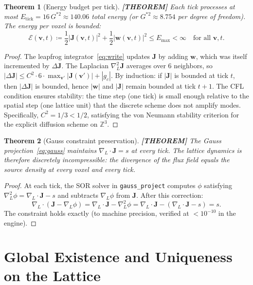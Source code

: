 \documentclass[11pt]{article}
\theoremstyle{tight}
\newtheorem{theorem}{Theorem}[section]
\theoremstyle{plainroman}
\newcommand{\Z}{\mathbb{Z}}
\begin{document}
\begin{theorem}[Energy budget per tick]\label{thm:energy}
\textbf{[THEOREM]}
Each tick processes at most $E_{\mathrm{tick}}=16\,G^{*2}\approx 140.06$ total energy (or $G^{*2}\approx 8.754$ per degree of freedom).
The energy per voxel is bounded:
\[
\mathcal E(\mathbf v,t)\coloneqq\frac{1}{2}|\mathbf J(\mathbf v,t)|^2+\frac{1}{2}|\mathbf w(\mathbf v,t)|^2\le E_{\max}<\infty \quad \text{for all } \mathbf v,t.
\]
\end{theorem}
\begin{proof}
The leapfrog integrator~\eqref{eq:write} updates $\mathbf J$ by adding $\mathbf w$, which was itself incremented by $\Delta\mathbf J$.
The Laplacian $\nabla_L^2\mathbf J$ averages over 6 neighbors, so $|\Delta\mathbf J|\le C^2\cdot 6\cdot\max_{\mathbf v'}|\mathbf J(\mathbf v')|+|g_c|$.
By induction: if $|\mathbf J|$ is bounded at tick $t$, then $|\Delta\mathbf J|$ is bounded, hence $|\mathbf w|$ and $|\mathbf J|$ remain bounded at tick $t+1$.
The CFL condition ensures stability: the time step (one tick) is small enough relative to the spatial step (one lattice unit) that the discrete scheme does not amplify modes.
Specifically, $C^2=1/3<1/2$, satisfying the von Neumann stability criterion for the explicit diffusion scheme on $\Z^3$.
\end{proof}

\begin{theorem}[Gauss constraint preservation]\label{thm:gauss_preserve}
\textbf{[THEOREM]}
The Gauss projection~\eqref{eq:gauss} maintains $\nabla_L\!\cdot\!\mathbf J=s$ at every tick.
The lattice dynamics is therefore \emph{discretely incompressible}: the divergence of the flux field equals the source density at every voxel and every tick.
\end{theorem}
\begin{proof}
At each tick, the SOR solver in \texttt{gauss\_project} computes $\phi$ satisfying $\nabla_L^2\phi=\nabla_L\!\cdot\!\mathbf J-s$ and subtracts $\nabla_L\phi$ from $\mathbf J$.
After this correction:
\[
\nabla_L\!\cdot\!(\mathbf J-\nabla_L\phi)=\nabla_L\!\cdot\!\mathbf J-\nabla_L^2\phi=\nabla_L\!\cdot\!\mathbf J-(\nabla_L\!\cdot\!\mathbf J-s)=s.
\]
The constraint holds exactly (to machine precision, verified at $<10^{-10}$ in the engine).
\end{proof}

\section{Global Existence and Uniqueness on the Lattice}
\end{document}
